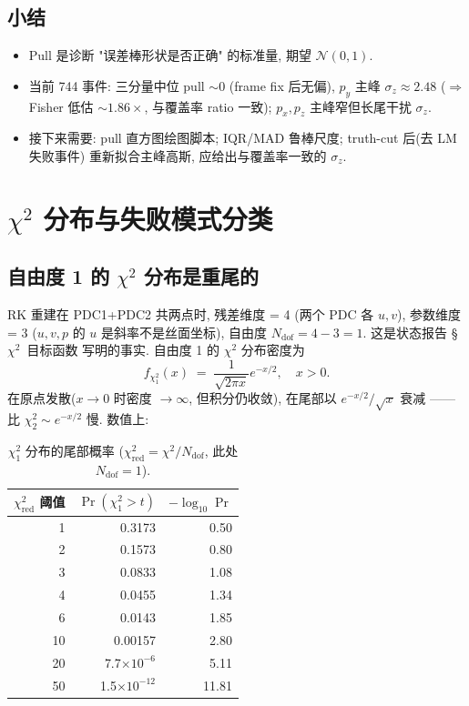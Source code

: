 \subsection{小结}
\label{sec:partIII:pulls:summary}

\begin{itemize}[nosep]
  \item Pull 是诊断 "误差棒形状是否正确" 的标准量, 期望 $\mathcal{N}(0, 1)$.
  \item 当前 744 事件: 三分量中位 pull $\sim 0$ (frame fix 后无偏), $p_y$ 主峰 $\sigma_z \approx 2.48$ ($\Rightarrow$ Fisher 低估 $\sim 1.86\times$, 与覆盖率 ratio 一致); $p_x, p_z$ 主峰窄但长尾干扰 $\sigma_z$.
  \item 接下来需要: pull 直方图绘图脚本; IQR/MAD 鲁棒尺度; truth-cut 后(去 LM 失败事件) 重新拟合主峰高斯, 应给出与覆盖率一致的 $\sigma_z$.
\end{itemize}


\section{$\chi^2$ 分布与失败模式分类}
\label{sec:partIII:chi2}

\subsection{自由度 1 的 $\chi^2$ 分布是重尾的}
\label{sec:partIII:chi2:dof1}

RK 重建在 PDC1+PDC2 共两点时, 残差维度 = 4 (两个 PDC 各 $u, v$), 参数维度 = 3 ($u, v, p$ 的 $u$ 是斜率不是丝面坐标), 自由度 $N_{\mathrm{dof}} = 4 - 3 = 1$. 这是状态报告 §\(\chi^2\)~目标函数 写明的事实. 自由度 1 的 $\chi^2$ 分布密度为
\[
  f_{\chi^2_1}(x) \;=\; \frac{1}{\sqrt{2\pi x}} e^{-x/2}, \quad x > 0.
\]
在原点发散($x \to 0$ 时密度 $\to \infty$, 但积分仍收敛), 在尾部以 $e^{-x/2}/\sqrt{x}$ 衰减 —— 比 $\chi^2_2 \sim e^{-x/2}$ 慢. 数值上:

\begin{table}[H]
\centering\small
\caption{$\chi^2_1$ 分布的尾部概率 ($\chi^2_{\mathrm{red}} = \chi^2 / N_{\mathrm{dof}}$, 此处 $N_{\mathrm{dof}} = 1$).}
\label{tab:partIII:chi2_tail_theory}
\begin{tabular}{rrr}
\toprule
$\chi^2_{\mathrm{red}}$ 阈值 & $\Pr(\chi^2_1 > t)$ & $-\log_{10}\Pr$ \\
\midrule
1   & 0.3173 & 0.50 \\
2   & 0.1573 & 0.80 \\
3   & 0.0833 & 1.08 \\
4   & 0.0455 & 1.34 \\
6   & 0.0143 & 1.85 \\
10  & 0.00157 & 2.80 \\
20  & 7.7$\times 10^{-6}$ & 5.11 \\
50  & 1.5$\times 10^{-12}$ & 11.81 \\
\bottomrule
\end{tabular}
\end{table}

